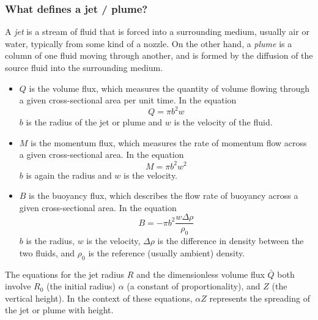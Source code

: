 \subsubsection{What defines a jet / plume?}
A \textit{jet} is a stream of fluid that is forced into a surrounding medium, usually air or water, typically from some kind of a nozzle. On the other hand, a \textit{plume} is a column of one fluid moving through another, and is formed by the diffusion of the source fluid into the surrounding medium.
\begin{itemize}
    \item \(Q\) is the volume flux, which measures the quantity of volume flowing through a given cross-sectional area per unit time. In the equation \begin{equation}Q = \pi b^2 w\end{equation} \(b\) is the radius of the jet or plume and \(w\) is the velocity of the fluid.
    \item \(M\) is the momentum flux, which measures the rate of momentum flow across a given cross-sectional area. In the equation \begin{equation}M = \pi b^2 w^2\end{equation} \(b\) is again the radius and \(w\) is the velocity.
    \item \(B\) is the buoyancy flux, which describes the flow rate of buoyancy across a given cross-sectional area. In the equation \begin{equation}B = -\pi b^2\frac{w\Delta \rho}{\rho_0}\end{equation} \(b\) is the radius, \(w\) is the velocity, \(\Delta \rho\) is the difference in density between the two fluids, and \(\rho_0\) is the reference (usually ambient) density.
\end{itemize}
The equations for the jet radius \(R\) and the dimensionless volume flux \(\bar{Q}\) both involve \(R_0\) (the initial radius) \(\alpha\) (a constant of proportionality), and \(Z\) (the vertical height). In the context of these equations, \(\alpha Z\) represents the spreading of the jet or plume with height.

